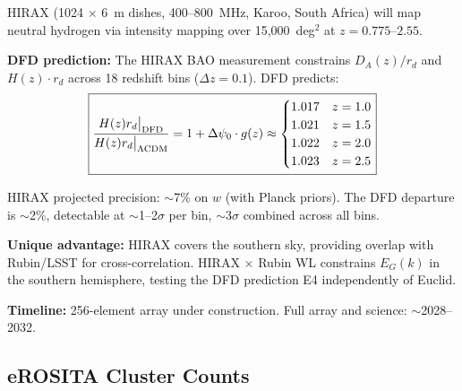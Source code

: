 \documentclass[11pt,a4paper]{article}
\begin{document}
\begin{newbox}[Prediction HIR1: HIRAX 21~cm BAO at $z = 0.8$--$2.5$ (NEW)]

HIRAX (1024 $\times$ 6~m dishes, 400--800~MHz, Karoo, South Africa)
will map neutral hydrogen via intensity mapping over 15,000~deg$^2$
at $z = 0.775$--$2.55$.

\textbf{DFD prediction:}
The HIRAX BAO measurement constrains $D_A(z)/r_d$ and $H(z) \cdot r_d$
across 18 redshift bins ($\Delta z = 0.1$). DFD predicts:
\begin{equation}
\boxed{
\frac{H(z) r_d\big|_{\rm DFD}}{H(z) r_d\big|_{\Lambda\rm CDM}}
= 1 + \Delta\psi_0 \cdot g(z) \approx
\begin{cases}
1.017 & z = 1.0 \\
1.021 & z = 1.5 \\
1.022 & z = 2.0 \\
1.023 & z = 2.5
\end{cases}
}
\end{equation}

HIRAX projected precision: $\sim$7\% on $w$ (with Planck priors).
The DFD departure is $\sim$2\%, detectable at $\sim$1--2$\sigma$ per bin,
$\sim$3$\sigma$ combined across all bins.

\textbf{Unique advantage:} HIRAX covers the southern sky, providing
overlap with Rubin/LSST for cross-correlation. HIRAX $\times$ Rubin WL
constrains $E_G(k)$ in the southern hemisphere, testing the DFD prediction
E4 independently of Euclid.

\textbf{Timeline:} 256-element array under construction. Full array and
science: $\sim$2028--2032.
\end{newbox}

\subsection{eROSITA Cluster Counts}
\end{document}
